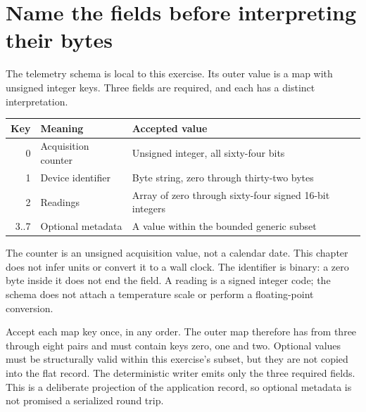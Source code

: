 \section{Name the fields before interpreting their bytes}
The telemetry schema is local to this exercise. Its outer value is a map with unsigned
integer keys. Three fields are required, and each has a distinct interpretation.

\begin{center}
\begin{tabular}{rll}
Key & Meaning & Accepted value \\
\hline
0 & Acquisition counter & Unsigned integer, all sixty-four bits \\
1 & Device identifier & Byte string, zero through thirty-two bytes \\
2 & Readings & Array of zero through sixty-four signed 16-bit integers \\
3..7 & Optional metadata & A value within the bounded generic subset \\
\end{tabular}
\end{center}

The counter is an unsigned acquisition value, not a calendar date. This chapter does
not infer units or convert it to a wall clock. The identifier is binary: a zero byte
inside it does not end the field. A reading is a signed integer code; the schema does
not attach a temperature scale or perform a floating-point conversion.

Accept each map key once, in any order. The outer map therefore has from three through
eight pairs and must contain keys zero, one and two. Optional values must be structurally
valid within this exercise's subset, but they are not copied into the flat record.
The deterministic writer emits only the three required fields. This is a deliberate
projection of the application record, so optional metadata is not promised a serialized
round trip.
